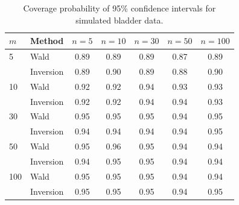 \documentclass{article}\usepackage[]{graphicx}\usepackage[]{color}
\begin{document}
\begin{table}[!htb]
\centering
\begin{tabular}{llccccc}
  \toprule
  $m$  & Method    & \hspace{8pt}$n = 5$\hspace{8pt} & \hspace{8pt}$n = 10$\hspace{8pt} & \hspace{8pt}$n = 30$\hspace{8pt} & \hspace{8pt}$n = 50$\hspace{8pt} & \hspace{8pt}$n = 100$ \hspace{8pt} \\
  \hline
  5    & Wald      & 0.89    & 0.89     & 0.89     & 0.87     & 0.89      \\
       & Inversion & 0.89    & 0.90     & 0.89     & 0.88     & 0.90      \\ \hline
  10   & Wald      & 0.92    & 0.92     & 0.94     & 0.93     & 0.93      \\
       & Inversion & 0.92    & 0.92     & 0.94     & 0.94     & 0.93      \\ \hline
  30   & Wald      & 0.95    & 0.95     & 0.95     & 0.94     & 0.95      \\
       & Inversion & 0.94    & 0.94     & 0.94     & 0.94     & 0.95      \\ \hline
  50   & Wald      & 0.95    & 0.96     & 0.95     & 0.94     & 0.94      \\
       & Inversion & 0.94    & 0.95     & 0.95     & 0.94     & 0.94      \\ \hline
  100  & Wald      & 0.95    & 0.95     & 0.95     & 0.94     & 0.94      \\
       & Inversion & 0.95    & 0.95     & 0.95     & 0.94     & 0.95      \\
  \bottomrule
\end{tabular}
\caption{Coverage probability of 95\% confidence intervals for simulated bladder data. \label{tab:simulation}}
\end{table}%
\end{document}
